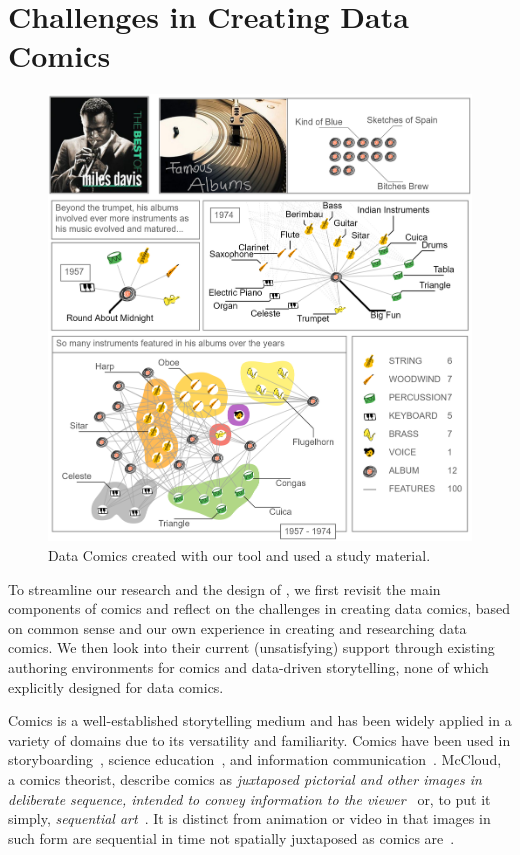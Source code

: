 \section{Challenges in Creating Data Comics}
\label{sec:data_comics}
\begin{figure}
 \includegraphics[width=\columnwidth]{figures/datacomic.png}
  \caption{Data Comics created with our tool and used a study material. }
\end{figure}

To streamline our research and the design of \toolname, we first revisit the main components of comics and reflect on the challenges in creating data comics, based on common sense and our own experience in creating and researching data comics. We then look into their current (unsatisfying) support through existing authoring environments for comics and data-driven storytelling, none of which explicitly designed for data comics.

Comics is a well-established storytelling medium and has been widely applied in a variety of domains due to its versatility and familiarity. Comics have been used in storyboarding~\cite{haesen2010draw,moraveji2007comicboarding}, science education~\cite{green2010graphic,tatalovic2009science}, and information communication~\cite{caldwell2012information}. McCloud, a comics theorist, describe comics as \textit{juxtaposed pictorial and other images in deliberate sequence, intended to convey information to the viewer}~\cite{mccloud1993understanding} or, to put it simply, \textit{sequential art}~\cite{mccloud1993understanding,eisner2008comics}. It is distinct from animation or video in that images in such form are sequential in time not spatially juxtaposed as comics are~\cite{mccloud1993understanding,groensteen2007system}.

